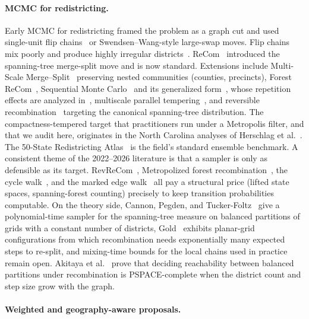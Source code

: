 \documentclass[11pt]{article}
\begin{document}
\paragraph{MCMC for redistricting.}\label{sec:related-mcmc}

Early MCMC for redistricting framed the problem as a graph cut and used
single-unit flip chains~\cite{fifield2020automated} or
Swendsen--Wang-style large-swap moves. Flip chains mix poorly and
produce highly irregular districts~\cite{deford2021recombination,
najt2024empirical}. ReCom~\cite{deford2021recombination} introduced
the spanning-tree merge-split move and is now standard. Extensions
include Multi-Scale Merge--Split~\cite{autry2020multiscale} preserving
nested communities (counties, precincts), Forest ReCom~\cite{autry2023metropolized},
Sequential Monte Carlo~\cite{mccartan2023sequential} and its
generalized form~\cite{osullivan2026generalized}, whose repetition
effects are analyzed in~\cite{cannon2024repetition}, multiscale
parallel tempering~\cite{chuang2025multiscale}, and reversible
recombination~\cite{cannon2022spanning} targeting the canonical
spanning-tree distribution. The compactness-tempered target that
practitioners run under a Metropolis filter, and that we audit here,
originates in the North Carolina analyses of Herschlag et
al.~\cite{herschlag2020quantifying}. The 50-State Redistricting
Atlas~\cite{mccartan2022simulated} is the field's standard ensemble
benchmark. A consistent theme of the 2022--2026 literature is that a
sampler is only as defensible as its target.
RevReCom~\cite{cannon2022spanning}, Metropolized forest
recombination~\cite{autry2023metropolized}, the cycle
walk~\cite{deford2025cycle}, and the marked edge
walk~\cite{mcwhorter2025marked} all pay a structural price (lifted
state spaces, spanning-forest counting) precisely to keep transition
probabilities computable. On the theory side, Cannon, Pegden, and
Tucker-Foltz~\cite{cannon2024sampling} give a polynomial-time sampler
for the spanning-tree measure on balanced partitions of grids with a
constant number of districts, Gold~\cite{gold2026adversarial}
exhibits planar-grid configurations from which recombination needs
exponentially many expected steps to re-split, and mixing-time bounds
for the local chains used in practice remain open. Akitaya et
al.~\cite{akitaya2022reconfiguration} prove that deciding
reachability between balanced partitions under recombination is
PSPACE-complete when the district count and step size grow with the
graph.

\paragraph{Weighted and geography-aware proposals.}\label{sec:related-weighted}
\end{document}
